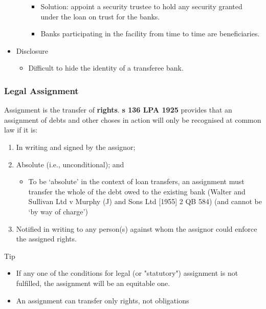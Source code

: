 \documentclass[
]{article}
\providecommand{\tightlist}{%
  \setlength{\itemsep}{0pt}\setlength{\parskip}{0pt}}
\newenvironment{env-a0fe8824-15a9-47d5-bf01-f54598533eae}
{
    \savenotes\tcolorbox[blanker,breakable,left=5pt,borderline west={2pt}{-4pt}{cyan}]
}
{
    \endtcolorbox\spewnotes
}
\begin{document}
\begin{itemize}
\begin{itemize}
    \begin{itemize}
    \tightlist
    \item
      Solution: appoint a security trustee to hold any security granted
      under the loan on trust for the banks.
    \item
      Banks participating in the facility from time to time are
      beneficiaries.
    \end{itemize}
  \end{itemize}
\item
  Disclosure

  \begin{itemize}
  \tightlist
  \item
    Difficult to hide the identity of a transferee bank.
  \end{itemize}
\end{itemize}

\hypertarget{legal-assignment}{%
\subsubsection{Legal Assignment}\label{legal-assignment}}

Assignment is the transfer of \textbf{rights}. \textbf{s 136 LPA 1925}
provides that an assignment of debts and other choses in action will
only be recognised at common law if it is:

\begin{enumerate}
\tightlist
\item
  In writing and signed by the assignor;
\item
  Absolute (i.e., unconditional); and

  \begin{itemize}
  \tightlist
  \item
    To be `absolute' in the context of loan transfers, an assignment
    must transfer the whole of the debt owed to the existing bank
    (Walter and Sullivan Ltd v Murphy (J) and Sons Ltd {[}1955{]} 2 QB
    584) (and cannot be `by way of charge')
  \end{itemize}
\item
  Notified in writing to any person(s) against whom the assignor could
  enforce the assigned rights.
\end{enumerate}

\begin{env-a0fe8824-15a9-47d5-bf01-f54598533eae}

Tip

\begin{itemize}
\tightlist
\item
  If any one of the conditions for legal (or "statutory") assignment is
  not fulfilled, the assignment will be an equitable one.
\item
  An assignment can transfer only rights, not obligations
\end{itemize}

\end{env-a0fe8824-15a9-47d5-bf01-f54598533eae}
\end{document}
